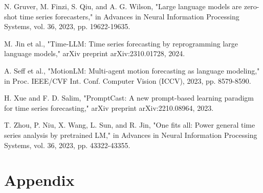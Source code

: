 \documentclass[conference]{IEEEtran}
\begin{document}
\begin{thebibliography}{00}
 N. Gruver, M. Finzi, S. Qiu, and A. G. Wilson, "Large language models are zero-shot time series forecasters," in Advances in Neural Information Processing Systems, vol. 36, 2023, pp. 19622-19635.

 M. Jin et al., "Time-LLM: Time series forecasting by reprogramming large language models," arXiv preprint arXiv:2310.01728, 2024.

 A. Seff et al., "MotionLM: Multi-agent motion forecasting as language modeling," in Proc. IEEE/CVF Int. Conf. Computer Vision (ICCV), 2023, pp. 8579-8590.

 H. Xue and F. D. Salim, "PromptCast: A new prompt-based learning paradigm for time series forecasting," arXiv preprint arXiv:2210.08964, 2023.

 T. Zhou, P. Niu, X. Wang, L. Sun, and R. Jin, "One fits all: Power general time series analysis by pretrained LM," in Advances in Neural Information Processing Systems, vol. 36, 2023, pp. 43322-43355.
\end{thebibliography}
\vspace{12pt}

\section{Appendix}
\end{document}
